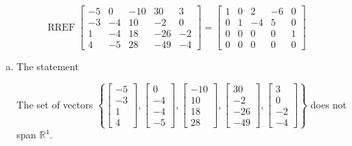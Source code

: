 \begin{exerciseAnswer} 


\[\operatorname{RREF} \left[\begin{array}{ccccc}
-5 & 0 & -10 & 30 & 3 \\
-3 & -4 & 10 & -2 & 0 \\
1 & -4 & 18 & -26 & -2 \\
4 & -5 & 28 & -49 & -4
\end{array}\right] = \left[\begin{array}{ccccc}
1 & 0 & 2 & -6 & 0 \\
0 & 1 & -4 & 5 & 0 \\
0 & 0 & 0 & 0 & 1 \\
0 & 0 & 0 & 0 & 0
\end{array}\right] \]


\begin{enumerate}[(a)]
\item The statement 
\begin{center}\begin{minipage}{0.8\textwidth}
 The set of vectors \( \left\{ \left[\begin{array}{c}
-5 \\
-3 \\
1 \\
4
\end{array}\right] , \left[\begin{array}{c}
0 \\
-4 \\
-4 \\
-5
\end{array}\right] , \left[\begin{array}{c}
-10 \\
10 \\
18 \\
28
\end{array}\right] , \left[\begin{array}{c}
30 \\
-2 \\
-26 \\
-49
\end{array}\right] , \left[\begin{array}{c}
3 \\
0 \\
-2 \\
-4
\end{array}\right] \right\} \) does not span \(\mathbb{R}^4\). 
\end{minipage}\end{center}

\end{enumerate}
\end{exerciseAnswer}
